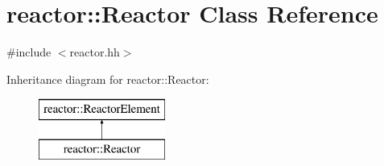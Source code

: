 \hypertarget{classreactor_1_1Reactor}{}\section{reactor\+:\+:Reactor Class Reference}
\label{classreactor_1_1Reactor}


{\ttfamily \#include $<$reactor.\+hh$>$}

Inheritance diagram for reactor\+:\+:Reactor\+:\begin{figure}[H]
\begin{center}
\leavevmode
\includegraphics[height=2.000000cm]{classreactor_1_1Reactor}
\end{center}
\end{figure}
